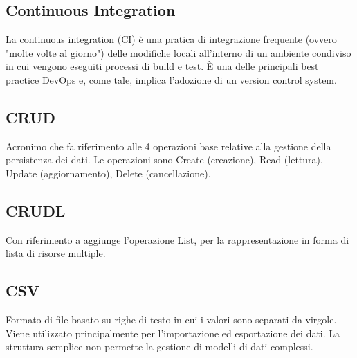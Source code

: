 \vspace{2em}
\subsection*{Continuous Integration}
La continuous integration (CI) è una pratica di integrazione frequente (ovvero "molte volte al giorno") delle modifiche locali all'interno di un ambiente condiviso in cui vengono eseguiti processi di build e test. È una delle principali best practice DevOps e, come tale, implica l'adozione di un version control system.

\vspace{2em}
\subsection*{CRUD}
Acronimo che fa riferimento alle 4 operazioni base relative alla gestione della persistenza dei dati. Le operazioni sono Create (creazione), Read (lettura), Update (aggiornamento), Delete (cancellazione).

\vspace{2em}
\subsection*{CRUDL}
\par Con riferimento a  aggiunge l'operazione List, per la rappresentazione in forma di lista di risorse multiple.

\vspace{2em}
\subsection*{CSV}
Formato di file basato su righe di testo in cui i valori sono separati da virgole. Viene utilizzato principalmente per l'importazione ed esportazione dei dati. La struttura semplice non permette la gestione di modelli di dati complessi.
